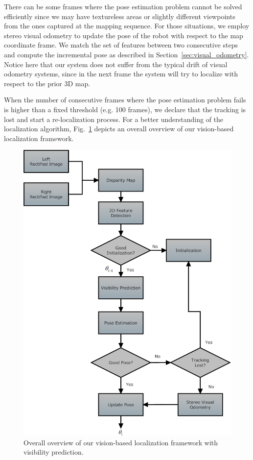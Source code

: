 There can be some frames where the pose estimation problem cannot be solved efficiently since we may have textureless areas or slightly different viewpoints from the ones captured at the mapping
sequence. For those situations, we employ stereo visual odometry to update the pose of the robot with respect to the map coordinate frame. We match the set of features between two consecutive steps and
compute the incremental pose as described in Section~\ref{sec:visual_odometry}. Notice here that our system does not suffer from the typical drift of visual odometry systems, since in the next frame the system will try to localize with respect to the prior 3D map.

When the number of consecutive frames where the pose estimation problem fails is higher than a fixed threshold (e.g. 100 frames), we declare that the tracking is lost and start a re-localization process. For a better understanding of the localization algorithm, Fig.~\ref{fig:vision_localization} depicts an overall overview of our vision-based localization framework.
%
\begin{figure}[ht!]
  \begin{center}
    \includegraphics[width=\linewidth]{images/vision_based_localization.png}
  \end{center}
  \caption{Overall overview of our vision-based localization framework with visibility prediction.\label{fig:vision_localization}}
\end{figure}
%

